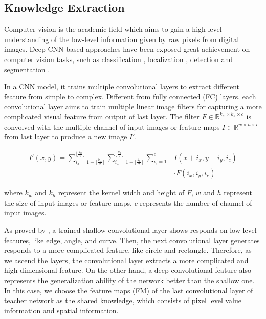 \documentclass[letterpaper]{article} %
\begin{document}
\subsection{Knowledge Extraction}

Computer vision is the academic field which aims to gain a high-level understanding of the low-level information given by raw pixels from digital images. Deep CNN based approaches have been exposed great achievement on computer vision tasks, such as classification \cite{geifman2017selective}, localization \cite{wei2017deep}, detection \cite{newell2017associative} and segmentation \cite{hu2017maskrnn}.

In a CNN model, it trains multiple convolutional layers to extract different feature from simple to complex. Different from fully connected (FC) layers, each convolutional layer aims to train multiple linear image filters for capturing a more complicated visual feature from output of last layer. The filter $F\in\mathbb{R}^{k_{w}\times k_{h}\times c}$ is convolved with the multiple channel of input images or feature maps $I\in\mathbb{R}^{w\times h\times c}$ from last layer to produce a new image $I'$.


\begin{equation}
\begin{split}
I'(x,y)=\sum_{i_{x}=1-\lceil\frac{k_w}{2}\rceil}^{\lfloor\frac{k_w}{2}\rfloor}\sum_{i_{x}=1-\lceil\frac{k_h}{2}\rceil}^{\lfloor\frac{k_h}{2}\rfloor}\sum_{i_c=1}^{c} &I(x+i_x,y+i_y,i_c)\\
&\cdot F(i_x,i_y,i_c)
\end{split}
\end{equation}

where $k_w$ and $k_h$ represent the kernel width and height of $F$, $w$ and $h$ represent the size of input images or feature maps, $c$ represents the number of channel of input images.

As proved by \cite{zeiler2014visualizing}, a trained shallow convolutional layer shows responds on low-level features, like edge, angle, and curve. Then, the next convolutional layer generates responds to a more complicated feature, like circle and rectangle. Therefore, as we ascend the layers, the convolutional layer extracts a more complicated and high dimensional feature. On the other hand, a deep convolutional feature also represents the generalization ability of the network better than the shallow one. In this case, we choose the feature maps (FM) of the last convolutional layer of teacher network as the shared knowledge, which consists of pixel level value information and spatial information.
\end{document}
